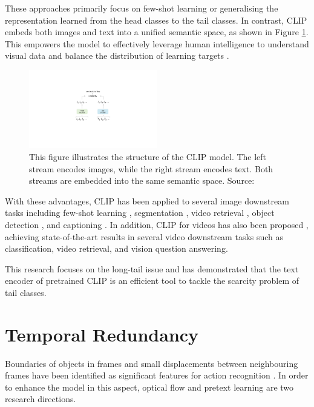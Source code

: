 These approaches primarily focus on few-shot learning or generalising the representation learned from the head classes to the tail classes. In contrast,  CLIP \parencite{radford2021learning} embeds both images and text into a unified semantic space, as shown in Figure \ref{fig:clipstructure}. This empowers the model to effectively leverage human intelligence to understand visual data and balance the distribution of learning targets \parencite{ma2022x}. 

\begin{figure}[ht]
    \centering
    \includegraphics[width=0.5\textwidth]{assets/charts_rw/CLIP}
    \caption[Illustration of CLIP Model Structure]{This figure illustrates the structure of the CLIP model. The left stream encodes images, while the right stream encodes text. Both streams are embedded into the same semantic space. Source: \parencite{cui2022contrastive}}
    \label{fig:clipstructure}
\end{figure}

With these advantages, CLIP has been applied to several image downstream tasks including few-shot learning \parencite{zhang2022tip}, segmentation \parencite{wang2022cris}, video retrieval \parencite{ma2022x}, object detection \parencite{lin2023gridclip}, and captioning \parencite{mokady2021clipcap}. In addition, CLIP for videos has also been proposed \parencite{xu-etal-2021-videoclip, wang2022internvideo}, achieving state-of-the-art results in several video downstream tasks such as classification, video retrieval, and vision question answering.

This research focuses on the long-tail issue and has demonstrated that the text encoder of pretrained CLIP is an efficient tool to tackle the scarcity problem of tail classes.

\section{Temporal Redundancy}
Boundaries of objects in frames and small displacements between neighbouring frames have been identified as significant features for action recognition \parencite{10.1007/978-3-030-12939-2_20}. In order to enhance the model in this aspect, optical flow and pretext learning are two research directions. 

